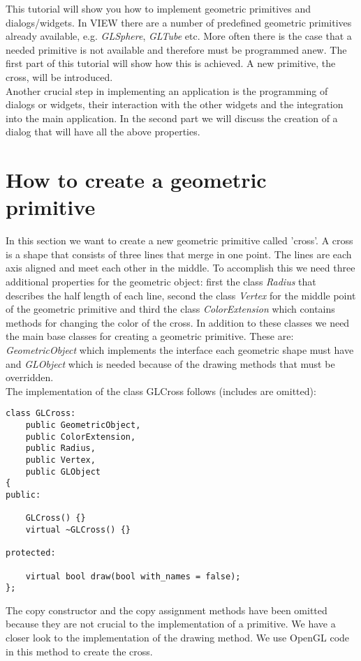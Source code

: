 
This tutorial will show you how to implement geometric primitives and dialogs/widgets.
In VIEW there are a number of predefined geometric primitives already available,
e.g. {\em GLSphere}, {\em GLTube} etc. More often there is the case that a needed
primitive is not available and therefore must be programmed anew. The first part
of this tutorial will show how this is achieved. A new primitive, the cross, will
be introduced.\\
Another crucial step in implementing an application is the programming of
dialogs or widgets, their interaction with the other widgets and the integration into
the main application. In the second part we will discuss the creation of a dialog 
that will have all the above properties.

\section{How to create a geometric primitive}
\label{section:view_create_a_geometric_primitive}

In this section we want to create a new geometric primitive called 'cross'.
A cross is a shape that consists of three lines that merge in one point.
The lines are each axis aligned and meet each other in the middle.
To accomplish this we need three additional properties for the geometric object:
first the class {\em Radius} that describes the half length of each line,
second the class {\em Vertex} for the middle point of the geometric primitive
and third the class {\em ColorExtension} which contains methods for changing
the color of the cross.
In addition to these classes we need the main base classes for creating a geometric
primitive. These are: {\em GeometricObject} which implements the interface each
geometric shape must have and {\em GLObject} which is needed because of the drawing
methods that must be overridden.\\
The implementation of the class GLCross follows (includes are omitted):

\begin{verbatim}
class GLCross: 
	public GeometricObject,
	public ColorExtension,
	public Radius,
	public Vertex,
	public GLObject
{
public:

	GLCross() {}
	virtual ~GLCross() {}

protected:

	virtual bool draw(bool with_names = false);
};
\end{verbatim}

The copy constructor and the copy assignment methods have been omitted because
they are not crucial to the implementation of a primitive. 
We have a closer look to the implementation of the drawing method.
We use OpenGL code in this method to create the cross.

